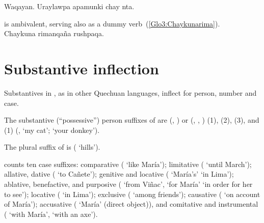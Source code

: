 {%
%
{Waqayan. Uraylawpa apamunki chay nta.}%
{}%
{}{}%

\noindent
{} is ambivalent, serving also as a dummy verb~(\ref{Glo3:Chaykunarima}).\\

%
{Chaykuna rimanqaña rushpaqa.}%
{}%
{}{}%

\section{Substantive inflection}
Substantives in \SYQ, as in other Quechuan languages, inflect for person, number and case.

The substantive (“possessive”) person suffixes of \SYQ{} are  (\AMV, \LT) or \phono{-:} (\ACH, \CH, \SP) (1),  (2),  (3), and  (1) (,  ‘my cat’;  ‘your donkey’).

The plural suffix of \SYQ{} is  ( ‘hills’).

\SYQ{} counts ten case suffixes: comparative  ( ‘like María’); limitative  ( ‘until March’); allative, dative  ( ‘to Cañete’); genitive and locative  ( ‘María’s’  ‘in Lima’); ablative, benefactive, and purposive  ( ‘from Viñac’,  ‘for María’  ‘in order for her to see’); locative  ( ‘in Lima’); exclusive  ( ‘among friends’); causative  ( ‘on account of María’); accusative  ( ‘María’ (direct object)), and comitative and instrumental  ( ‘with María’,  ‘with an axe’).

}
